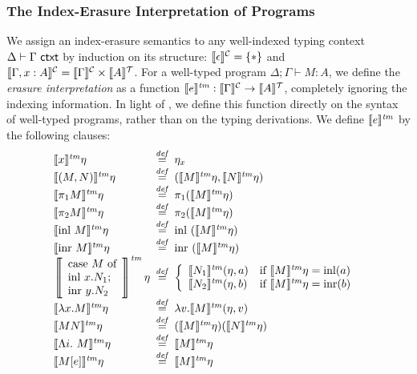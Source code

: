 \subsubsection{The Index-Erasure Interpretation of Programs}
\label{sec:erasure-semantics-programs}


We assign an index-erasure semantics to any well-indexed typing
context $\Delta \vdash \Gamma \textsf{ ctxt}$ by induction on its structure:
$\llbracket \epsilon \rrbracket^{\mathcal{C}} = \{*\}$ and $\llbracket \Gamma, x : A \rrbracket^{\mathcal{C}} =
\llbracket \Gamma \rrbracket^{\mathcal{C}} \times \llbracket A \rrbracket^{\mathcal{T}}$. For a well-typed program $\Delta;
\Gamma \vdash M : A$, we define the \emph{erasure interpretation} as a
function $\llbracket e \rrbracket^{\mathit{tm}} : \llbracket \Gamma \rrbracket^{\mathcal{C}} \to \llbracket A \rrbracket^{\mathcal{T}}$, completely
ignoring the indexing information. In light of
, we define this function directly on
the syntax of well-typed programs, rather than on the typing
derivations. We define $\llbracket e \rrbracket^{\mathit{tm}}$ by the following clauses:
\begin{displaymath}
  \begin{array}{@{\hspace{0em}}l@{\hspace{0.5em}}c@{\hspace{0.5em}}l}
    \tmSem{x}\eta & \isDefinedAs & \eta_x \\
    \tmSem{(M,N)}\eta & \isDefinedAs & (\tmSem{M}\eta, \tmSem{N}\eta) \\
    \tmSem{\pi_1M}\eta & \isDefinedAs & \pi_1(\tmSem{M}\eta) \\
    \tmSem{\pi_2M}\eta & \isDefinedAs & \pi_2(\tmSem{M}\eta) \\
    \tmSem{\mathrm{inl}\ M}\eta & \isDefinedAs & \mathrm{inl}\ (\tmSem{M}\eta) \\
    \tmSem{\mathrm{inr}\ M}\eta & \isDefinedAs & \mathrm{inr}\ (\tmSem{M}\eta) \\
    \left\llbracket
      \begin{array}{l}
        \textrm{case}\ M\ \textrm{of}\\
        \textrm{inl}\ x.N_1;\\
        \textrm{inr}\ y.N_2
      \end{array}\right\rrbracket^{\mathit{tm}}\eta & \isDefinedAs &
    \left\{
      \begin{array}{ll}
        \tmSem{N_1}(\eta,a) & \textrm{if }\tmSem{M}\eta = \mathrm{inl}(a) \\
        \tmSem{N_2}(\eta,b) & \textrm{if }\tmSem{M}\eta = \mathrm{inr}(b)
      \end{array}
    \right. \\
    \tmSem{\lambda x. M}\eta & \isDefinedAs & \lambda v. \tmSem{M}(\eta, v) \\
    \tmSem{M N}\eta & \isDefinedAs & (\tmSem{M}\eta) (\tmSem{N}\eta) \\
    \tmSem{\Lambda i.\ M}\eta & \isDefinedAs & \tmSem{M}\eta \\
    \tmSem{M[e]}\eta & \isDefinedAs & \tmSem{M}\eta    
  \end{array}
\end{displaymath}
